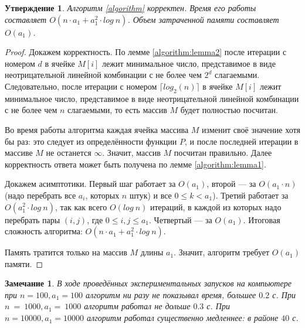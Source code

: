 \documentclass[12pt]{article}
\newtheorem{proposition}[theorem]{Утверждение}
\newtheorem{remark}[theorem]{Замечание}
\theoremstyle{definition}
\begin{document}
\begin{proposition}
Алгоритм \ref{algorithm} корректен. Время его работы составляет $O(n \cdot a_1 + a_1^2 \cdot log \ n)$. Объем затраченной памяти составляет $O(a_1)$.
\end{proposition}
\begin{proof}
Докажем корректность. По лемме \ref{algorithm:lemma2} после итерации с номером $d$ в ячейке $M[i]$ лежит минимальное число, представимое в виде неотрицательной линейной комбинации с не более чем $2^d$ слагаемыми. Следовательно, после итерации с номером $\lceil log_2(n) \rceil$ в ячейке $M[i]$ лежит минимальное число, представимое в виде неотрицательной линейной комбинации с не более чем $n$ слагаемыми, то есть массив $M$ будет полностью посчитан.

Во время работы алгоритма каждая ячейка массива $M$ изменит своё значение хотя бы раз: это следует из определённости функции $P$, и после последней итерации в массиве $M$ не останется $\infty$. Значит, массив $M$ посчитан правильно. Далее корректность ответа может быть получена по лемме \ref{algorithm:lemma1}.

Докажем асимптотики. Первый шаг работает за $O(a_1)$, второй --- за $O(a_1 \cdot n)$ (надо перебрать все $a_i$, которых $n$ штук) и все $0 \le k < a_1$). Третий работает за $O(a_1^2 \cdot log \ n)$, так как всего $O(log \ n)$ итераций, в каждой из которых надо перебрать пары $(i, j)$, где $0 \le i, j \le a_1$. Четвертый --- за $O(a_1)$. Итоговая сложность алгоритма: $O(n \cdot a_1 + a_1^2 \cdot log \ n)$.

Память тратится только на массив $M$ длины $a_1$. Значит, алгоритм требует $O(a_1)$ памяти.
\end{proof}

\begin{remark}
В ходе проведённых экспериментальных запусков на компьютере при $n = 100, a_1 = 100$ алгоритм ни разу не показывал время, большее $0.2$ с. При $n~=~1000, a_1 =~1000$ алгоритм работал не дольше $0.3$ с. При $n = 10000, a_1 = 10000$ алгоритм работал существенно медленнее: в районе $40$ с.
\end{remark}
\end{document}
